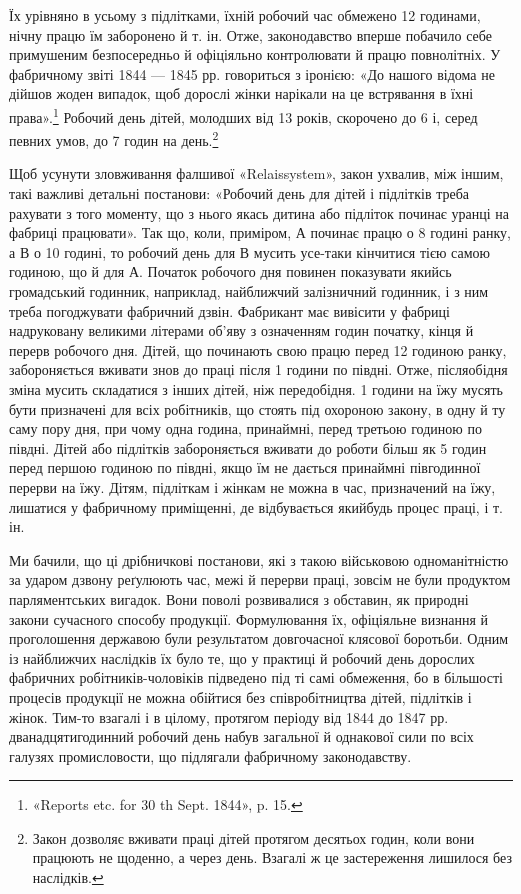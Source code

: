 \parcont{}  %
Їх урівняно в усьому з підлітками, їхній робочий час обмежено
12 годинами, нічну працю їм заборонено й т. ін. Отже, законодавство
вперше побачило себе примушеним безпосередньо й офіціяльно
контролювати й працю повнолітніх. У фабричному звіті 1844 —
1845 рр. говориться з іронією: «До нашого відома не дійшов
жоден випадок, щоб дорослі жінки нарікали на це встрявання
в їхні права».\footnote{
«Reports etc. for 30 th Sept. 1844», p. 15.
} Робочий день дітей, молодших від 13 років,
скорочено до 6 і, серед певних умов, до 7 годин на день.\footnote{
Закон дозволяє вживати праці дітей протягом десятьох годин,
коли вони працюють не щоденно, а через день. Взагалі ж це застереження
лишилося без наслідків.
}

Щоб усунути зловживання фалшивої «Relaissystem», закон
ухвалив, між іншим, такі важливі детальні постанови: «Робочий
день для дітей і підлітків треба рахувати з того моменту, що з
нього якась дитина або підліток починає уранці на фабриці
працювати». Так що, коли, приміром, А починає працю о 8 годині
ранку, а В о 10 годині, то робочий день для В мусить усе-таки кінчитися тією самою годиною, що й для
А. Початок робочого
дня повинен показувати якийсь громадський годинник, наприклад,
найближчий залізничний годинник, і з ним треба погоджувати
фабричний дзвін. Фабрикант має вивісити у фабриці надруковану
великими літерами об’яву з означенням годин початку,
кінця й перерв робочого дня. Дітей, що починають свою працю
перед 12 годиною ранку, забороняється вживати знов до праці
після 1 години по півдні. Отже, післяобідня зміна мусить складатися
з інших дітей, ніж передобідня. 1 години на їжу мусять
бути призначені для всіх робітників, що стоять під охороною закону,
в одну й ту саму пору дня, при чому одна година, принаймні,
перед третьою годиною по півдні. Дітей або підлітків забороняється
вживати до роботи більш як 5 годин перед першою годиною
по півдні, якщо їм не дається принаймні півгодинної перерви на
їжу. Дітям, підліткам і жінкам не можна в час, призначений на
їжу, лишатися у фабричному приміщенні, де відбувається якийбудь
процес праці, і т. ін.

Ми бачили, що ці дрібничкові постанови, які з такою військовою
одноманітністю за ударом дзвону реґулюють час, межі й
перерви праці, зовсім не були продуктом парляментських вигадок.
Вони поволі розвивалися з обставин, як природні закони
сучасного способу продукції. Формулювання їх, офіціяльне
визнання й проголошення державою були результатом довгочасної
клясової боротьби. Одним із найближчих наслідків їх
було те, що у практиці й робочий день дорослих фабричних робітників-чоловіків
підведено під ті самі обмеження, бо в більшості
процесів продукції не можна обійтися без співробітництва дітей,
підлітків і жінок. Тим-то взагалі і в цілому, протягом періоду
від 1844 до 1847 рр. дванадцятигодинний робочий день набув загальної
й однакової сили по всіх галузях промисловости, що
підлягали фабричному законодавству.
